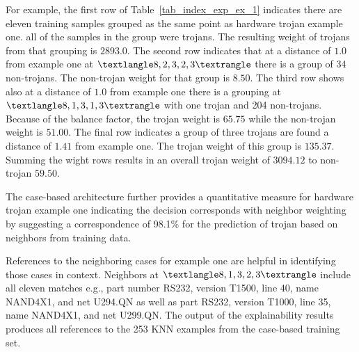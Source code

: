 For example, the first row of Table~\ref{tab_index_exp_ex_1} indicates there are
eleven training samples grouped as the same point as hardware trojan example
one. all of the samples in the group were trojans.  The resulting weight of
trojans from that grouping is $2893.0$.  The second row indicates that at a
distance of $1.0$ from example one at $\textlangle 8, 2, 3, 2, 3\textrangle$
there is a group of 34 non-trojans.  The non-trojan weight for that group is
$8.50$.  The third row shows also  at a distance of $1.0$ from example one there
is a grouping at $\textlangle 8, 1, 3, 1, 3\textrangle$ with one trojan and 204
non-trojans.  Because of the balance factor, the trojan weight is $65.75$ while
the non-trojan weight is $51.00$.  The final row indicates a group of three
trojans are found a distance of $1.41$ from example one. The trojan weight of
this group is $135.37$. Summing the wight rows results in an overall trojan
weight of $3094.12$ to non-trojan $59.50$.


The case-based architecture further provides a quantitative measure for hardware
trojan example one indicating the decision corresponds with neighbor weighting
by suggesting a correspondence of 98.1\% for the prediction of trojan based on
neighbors from training data.

References to the neighboring cases for example one are helpful in identifying
those cases in context.  Neighbors at $\textlangle 8, 1, 3, 2, 3\textrangle$
include all eleven matches e.g., part number RS232, version T1500, line 40, name
NAND4X1, and net U294.QN as well as part RS232, version T1000, line 35, name
NAND4X1, and net U299.QN. The output of the explainability results produces all
references to the 253 KNN examples from the case-based training set.


